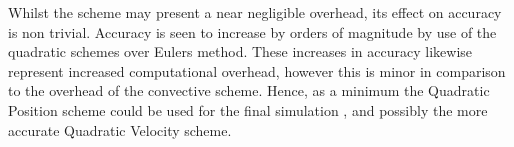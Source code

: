 Whilst the scheme may present a near negligible overhead, its effect on accuracy is non trivial. Accuracy is seen to increase by orders of magnitude by use of the quadratic schemes over Eulers method. These increases in accuracy likewise represent increased computational overhead, however this is minor in comparison to the overhead of the convective scheme. Hence, as a minimum the Quadratic Position scheme could be used for the final simulation , and possibly the more accurate Quadratic Velocity scheme.